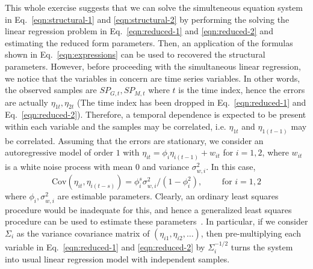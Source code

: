\documentclass[11pt, a4paper]{article}
\begin{document}
\noindent This whole exercise suggests that we can solve the simulteneous equation system in Eq.~\eqref{eqn:structural-1} and \eqref{eqn:structural-2} by performing the solving the linear regression problem in Eq.~\eqref{eqn:reduced-1} and \eqref{eqn:reduced-2} and estimating the reduced form parameters. Then, an application of the formulas shown in Eq.~\eqref{eqn:expressions} can be used to recovered the structural parameters. However, before proceeding with the simultaneous linear regression, we notice that the variables in concern are time series variables. In other words, the observed samples are $SP_{G,t}, SP_{M,t}$ where $t$ is the time index, hence the errors are actually $\eta_{1t}, \eta_{2t}$ (The time index has been dropped in Eq.~\eqref{eqn:reduced-1} and Eq.~\eqref{eqn:reduced-2}). Therefore, a temporal dependence is expected to be present within each variable and the samples may be correlated, i.e. $\eta_{1t}$ and $\eta_{1(t-1)}$ may be correlated. Assuming that the errors are stationary, we consider an autoregressive model of order $1$ with $\eta_{it} = \phi_i \eta_{i(t-1)} + w_{it}$ for $i = 1, 2$, where $w_{it}$ is a white noise process with mean $0$ and variance $\sigma_{w,i}^2$. In this case,
%
$$
\text{Cov}(\eta_{it}, \eta_{i(t-s)}) = \phi_i^s\sigma^2_{w, i}/(1 - \phi_i^2), \qquad \text{ for } i = 1, 2
$$
%
\noindent where $\phi_i, \sigma_{w,i}^2$ are estimable parameters. Clearly, an ordinary least squares procedure would be inadequate for this, and hence a generalized least squares procedure can be used to estimate these parameters~\cite{fox2002time}. In particular, if we consider $\Sigma_i$ as the variance covariance matrix of $(\eta_{i1}, \eta_{i2}, \dots)$, then pre-multiplying each variable in Eq.~\eqref{eqn:reduced-1} and \eqref{eqn:reduced-2} by $\Sigma_i^{-1/2}$ turns the system into usual linear regression model with independent samples.
\end{document}
